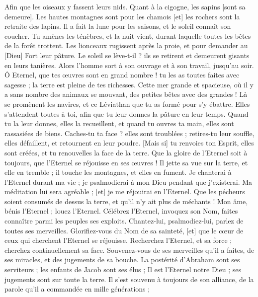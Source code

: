 \begin{multicols}{2}
Afin que les oiseaux y fassent leurs nids. Quant à la cigogne, les sapins [sont sa demeure].
Les hautes montagnes sont pour les chamois [et] les rochers sont la retraite des lapins.
Il a fait la lune pour les saisons, et le soleil connaît son coucher.
Tu amènes les ténèbres, et la nuit vient, durant laquelle toutes les bêtes de la forêt trottent.
Les lionceaux rugissent après la proie, et pour demander au [Dieu] Fort leur pâture.
Le soleil se lève-t-il ? ils se retirent et demeurent gisants en leurs tanières.
Alors l'homme sort à son ouvrage et à son travail, jusqu’au soir.
Ô Eternel, que tes œuvres sont en grand nombre ! tu les as toutes faites avec sagesse ; la terre est pleine de tes richesses.
Cette mer grande et spacieuse, où il y a sans nombre des animaux se mouvant, des petites bêtes avec des grandes !
Là se promènent les navires, et ce Léviathan que tu as formé pour s'y ébattre.
Elles s'attendent toutes à toi, afin que tu leur donnes la pâture en leur temps.
Quand tu la leur donnes, elles la recueillent, et quand tu ouvres ta main, elles sont rassasiées de biens.
Caches-tu ta face ? elles sont troublées ; retires-tu leur souffle, elles défaillent, et retournent en leur poudre.
[Mais si] tu renvoies ton Esprit, elles sont créées, et tu renouvelles la face de la terre.
Que la gloire de l'Eternel soit à toujours, que l'Eternel se réjouisse en ses œuvres !
Il jette sa vue sur la terre, et elle en tremble ; il touche les montagnes, et elles en fument.
Je chanterai à l'Eternel durant ma vie ; je psalmodierai à mon Dieu pendant que j'existerai.
Ma méditation lui sera agréable ; [et] je me réjouirai en l'Eternel.
Que les pécheurs soient consumés de dessus la terre, et qu'il n'y ait plus de méchants ! Mon âme, bénis l'Eternel ; louez l'Eternel.
\VerseOne{}Célébrez l'Eternel, invoquez son Nom, faites connaître parmi les peuples ses exploits.
Chantez-lui, psalmodiez-lui, parlez de toutes ses merveilles.
Glorifiez-vous du Nom de sa sainteté, [et] que le cœur de ceux qui cherchent l'Eternel se réjouisse.
Recherchez l'Eternel, et sa force ; cherchez continuellement sa face.
Souvenez-vous de ses merveilles qu'il a faites, de ses miracles, et des jugements de sa bouche.
La postérité d'Abraham sont ses serviteurs ; les enfants de Jacob sont ses élus ;
Il est l'Eternel notre Dieu ; ses jugements sont sur toute la terre.
Il s'est souvenu à toujours de son alliance, de la parole qu'il a commandée en mille générations ;

\end{multicols}
